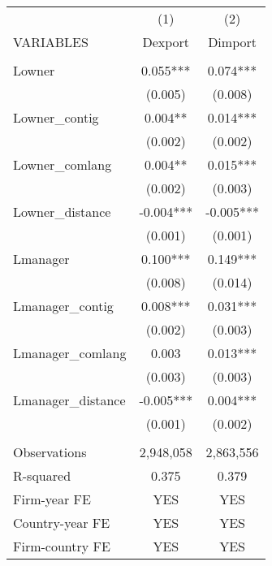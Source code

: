 \begin{tabular}{lcc} \hline
 & (1) & (2) \\
VARIABLES & Dexport & Dimport \\ \hline
 &  &  \\
Lowner & 0.055*** & 0.074*** \\
 & (0.005) & (0.008) \\
Lowner\_contig & 0.004** & 0.014*** \\
 & (0.002) & (0.002) \\
Lowner\_comlang & 0.004** & 0.015*** \\
 & (0.002) & (0.003) \\
Lowner\_distance & -0.004*** & -0.005*** \\
 & (0.001) & (0.001) \\
Lmanager & 0.100*** & 0.149*** \\
 & (0.008) & (0.014) \\
Lmanager\_contig & 0.008*** & 0.031*** \\
 & (0.002) & (0.003) \\
Lmanager\_comlang & 0.003 & 0.013*** \\
 & (0.003) & (0.003) \\
Lmanager\_distance & -0.005*** & 0.004*** \\
 & (0.001) & (0.002) \\
 &  &  \\
Observations & 2,948,058 & 2,863,556 \\
R-squared & 0.375 & 0.379 \\
Firm-year FE & YES & YES \\
Country-year FE & YES & YES \\
 Firm-country FE & YES & YES \\ \hline
\end{tabular}
